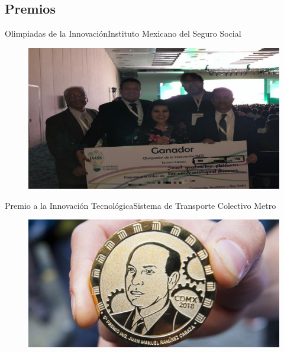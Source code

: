 \documentclass{beamer}
\begin{document}
    \subsection{Premios}

    \begin{frame}{Olimpiadas de la Innovación}{Instituto Mexicano del Seguro Social}
        \begin{figure}[]
            \centering
            \includegraphics[width=\textwidth, height=0.95\textheight, keepaspectratio]{olimpiadas}
        \end{figure}
    \end{frame}


    \begin{frame}{Premio a la Innovación Tecnológica}{Sistema de Transporte Colectivo Metro}
        \begin{figure}[]
            \centering
            \includegraphics[width=\textwidth]{medalla}
        \end{figure}
    \end{frame}
\end{document}
